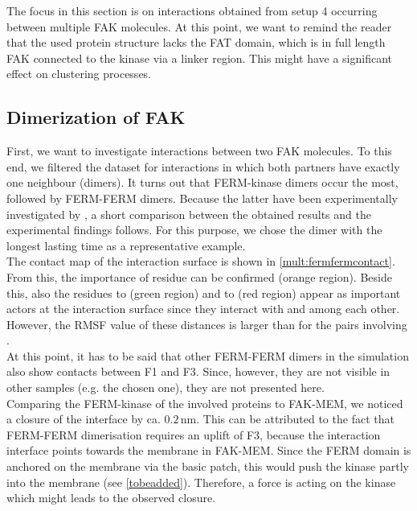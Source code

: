\label{multiProt}
The focus in this section is on interactions obtained from setup 4 occurring between multiple FAK molecules. At this point, we want to remind the reader that the used protein structure lacks the FAT domain, which is in full length FAK connected to the kinase via a linker region. This might have a significant effect on clustering processes.
\subsection{Dimerization of FAK}
\label{mult:dimers}
First, we want to investigate interactions between two FAK molecules. To this end, we filtered the dataset for interactions in which both partners have exactly one neighbour (dimers). It turns out that FERM-kinase dimers occur the most, followed by FERM-FERM dimers. Because the latter have been experimentally investigated by \textcite{fakdimers}, a short comparison between the obtained results and the experimental findings follows. For this purpose, we chose the dimer with the longest lasting time as a representative example.\\
The contact map of the interaction surface is shown in \autoref{mult:fermfermcontact}. From this, the importance of residue  can be confirmed (orange region). Beside this, also the residues  to  (green region) and  to  (red region) appear as important actors at the interaction surface since they interact with  and among each other. However, the RMSF value of these distances is larger than for the pairs involving .\\
At this point, it has to be said that other FERM-FERM dimers in the simulation also show contacts between F1 and F3. Since, however, they are not visible in other samples (e.g. the chosen one), they are not presented here.\\
Comparing the FERM-kinase of the involved proteins to FAK-MEM, we noticed a closure of the interface by ca. $0.2\,\si{\nano\metre}$. This can be attributed to the fact that FERM-FERM dimerisation requires an uplift of F3, because the interaction interface points towards the membrane in FAK-MEM. Since the FERM domain is anchored on the membrane via the basic patch, this would push the kinase partly into the membrane (see \autoref{tobeadded}). Therefore, a force is acting on the kinase which might leads to the observed closure.
%
%
%
